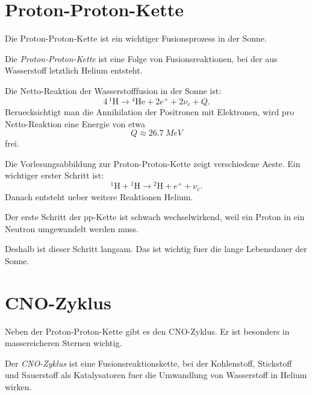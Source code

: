 \section{Proton-Proton-Kette}

Die Proton-Proton-Kette ist ein wichtiger Fusionsprozess in der Sonne.

\begin{definitionbox}
Die \emph{Proton-Proton-Kette} ist eine Folge von Fusionsreaktionen, bei der aus
Wasserstoff letztlich Helium entsteht.
\end{definitionbox}

\begin{conceptbox}
Die Netto-Reaktion der Wasserstofffusion in der Sonne ist:
\[
    4\,{}^{1}\mathrm{H}
    \rightarrow
    {}^{4}\mathrm{He}
    + 2e^+
    + 2\nu_e
    + Q.
\]
Beruecksichtigt man die Annihilation der Positronen mit Elektronen, wird pro
Netto-Reaktion eine Energie von etwa
\[
    Q \approx \SI{26.7}{MeV}
\]
frei.
\end{conceptbox}

\begin{notebox}
Die Vorlesungsabbildung zur Proton-Proton-Kette zeigt verschiedene Aeste.
Ein wichtiger erster Schritt ist:
\[
    {}^{1}\mathrm{H}
    +
    {}^{1}\mathrm{H}
    \rightarrow
    {}^{2}\mathrm{H}
    +
    e^+
    +
    \nu_e.
\]
Danach entsteht ueber weitere Reaktionen Helium.
\end{notebox}

\begin{conceptbox}
Der erste Schritt der pp-Kette ist schwach wechselwirkend, weil ein Proton in ein
Neutron umgewandelt werden muss.

Deshalb ist dieser Schritt langsam.
Das ist wichtig fuer die lange Lebensdauer der Sonne.
\end{conceptbox}

\section{CNO-Zyklus}

Neben der Proton-Proton-Kette gibt es den CNO-Zyklus.
Er ist besonders in massereicheren Sternen wichtig.

\begin{definitionbox}
Der \emph{CNO-Zyklus} ist eine Fusionsreaktionskette, bei der Kohlenstoff, Stickstoff
und Sauerstoff als Katalysatoren fuer die Umwandlung von Wasserstoff in Helium wirken.
\end{definitionbox}

